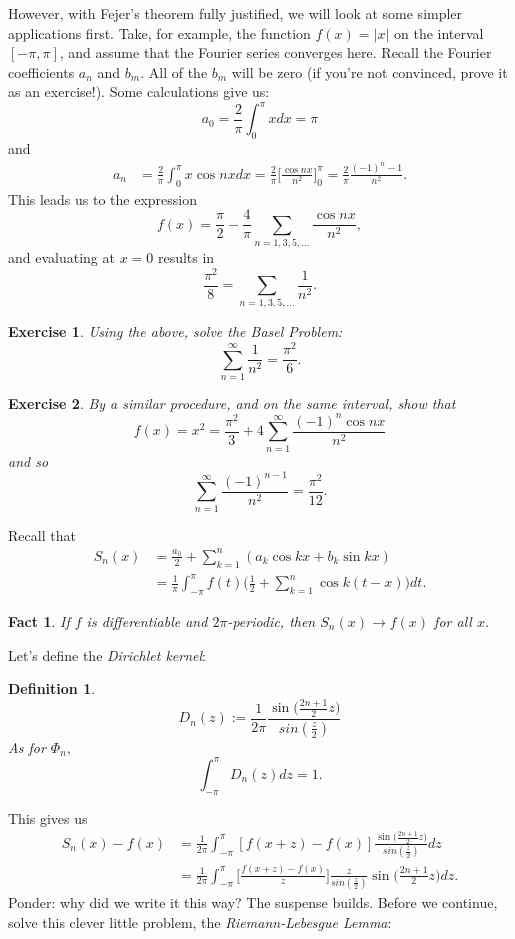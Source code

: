 \documentclass{article}
\newtheorem{defn}{Definition}[section]
\newtheorem{exer}{Exercise}[section]
\newtheorem{fact}{Fact}[section]
\begin{document}
However, with Fejer's theorem fully justified, we will look at some simpler applications first. Take, for example, the function $f(x) = \vert x \vert$ on the interval $[-\pi,\pi]$, and assume that the Fourier series converges here. Recall the Fourier coefficients $a_{n}$ and $b_{m}$. All of the $b_{m}$ will be zero (if you're not convinced, prove it as an exercise!). Some calculations give us:
$$
a_{0} = \frac{2}{\pi} \int_{0}^{\pi}xdx = \pi
$$
and
\begin{align*}
a_{n} &= \frac{2}{\pi} \int_{0}^{\pi} x\cos nxdx = \frac{2}{\pi} \Big[\frac{\cos nx}{n^2}\Big]_{0}^{\pi} = \frac{2}{\pi} \frac{(-1)^{n}-1}{n^2}.
\end{align*}
This leads us to the expression
$$
f(x) = \frac{\pi}{2} - \frac{4}{\pi}\sum_{n=1,3,5,\ldots} \frac{\cos nx}{n^2},
$$
and evaluating at $x=0$ results in
$$
\frac{\pi^2}{8} = \sum_{n=1,3,5,\ldots}\frac{1}{n^2}.
$$
\begin{exer}
Using the above, solve the Basel Problem:
$$
\sum_{n=1}^{\infty} \frac{1}{n^2} = \frac{\pi^2}{6}.
$$
\end{exer}

\begin{exer}
By a similar procedure, and on the same interval, show that
$$
f(x) = x^{2} = \frac{\pi^2}{3} + 4\sum_{n=1}^{\infty} \frac{(-1)^{n}\cos nx}{n^2}
$$
and so
$$
\sum_{n=1}^{\infty} \frac{(-1)^{n-1}}{n^2} = \frac{\pi^2}{12}.
$$
\end{exer}

Recall that
\begin{align}
S_{n}(x) &= \frac{a_0}{2} + \sum_{k=1}^{n}(a_{k}\cos kx + b_{k}\sin kx) \\
	&= \frac{1}{\pi} \int_{-\pi}^{\pi}f(t) \big( \frac{1}{2} + \sum_{k=1}^{n}\cos k(t-x) \big) dt.
\end{align}

\begin{fact}
If $f$ is differentiable and $2\pi$-periodic, then $S_{n}(x) \to f(x)$ for all $x$.
\end{fact}

Let's define the \textit{Dirichlet kernel}:
\begin{defn}
$$
D_{n}(z) :=\frac{1}{2\pi} \frac{\sin \big(\frac{2n+1}{2}z \big)}{sin(\frac{z}{2})}
$$
As for $\Phi_{n},$ 
$$
\int_{-\pi}^{\pi} D_{n}(z)dz =1.
$$
\end{defn}
This gives us
\begin{align}
S_{n}(x) - f(x) &= \frac{1}{2\pi} \int_{-\pi}^{\pi} [f(x+z)-f(x)] \frac{\sin \big(\frac{2n+1}{2}z \big)}{sin(\frac{z}{2})}dz \\
		     &= \frac{1}{2\pi} \int_{-\pi}^{\pi} \Big[\frac{f(x+z)-f(x)}{z}\Big] \frac{z}{sin(\frac{z}{2})}\sin \big(\frac{2n+1}{2}z \big)dz.
\end{align}
Ponder: why did we write it this way? The suspense builds. Before we continue, solve this clever little problem, the \textit{Riemann-Lebesgue Lemma}:
\end{document}
